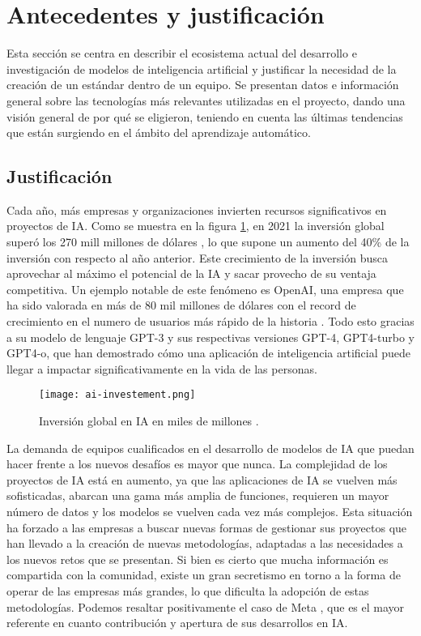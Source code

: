 \section{Antecedentes y justificación}
Esta sección se centra en describir el ecosistema actual del desarrollo e investigación 
de modelos de inteligencia artificial y justificar la necesidad de la creación de un
estándar dentro de un equipo. Se presentan datos e información general sobre las 
tecnologías más relevantes utilizadas en el proyecto, dando una visión general 
de por qué se eligieron, teniendo en cuenta las últimas tendencias que están
surgiendo en el ámbito del aprendizaje automático.

\subsection{Justificación}
Cada año, más empresas y organizaciones invierten recursos significativos en 
proyectos de IA. Como se muestra en la figura \ref{fig:ai-investement},
en 2021 la inversión global superó los 270 mill millones de dólares \cite{Letzing2024-nn},
lo que supone un aumento del 40\% de la inversión con respecto al año anterior.
Este crecimiento de la inversión busca aprovechar al máximo el potencial de la IA 
y sacar provecho de su ventaja competitiva. Un ejemplo notable de este fenómeno es OpenAI, 
una empresa que ha sido valorada en más de 80 mil millones de dólares \cite{noauthor_2024-uj} con el record de crecimiento 
en el numero de usuarios más rápido de la historia \cite{Armenta2023-xt}. Todo esto
gracias a su modelo de lenguaje GPT-3 y sus respectivas versiones GPT-4, GPT4-turbo y GPT4-o, 
que han demostrado cómo una aplicación de inteligencia artificial puede llegar a
impactar significativamente en la vida de las personas.

\begin{figure}[ht]
    \centering
    \texttt{[image: ai-investement.png]}
    \caption{Inversión global en IA en miles de millones \cite{Letzing2024-nn}.}
    \label{fig:ai-investement}
\end{figure}

La demanda de equipos cualificados en el desarrollo de modelos de IA 
que puedan hacer frente a los nuevos desafíos es mayor que nunca. La complejidad
de los proyectos de IA está en aumento, ya que las aplicaciones de IA
se vuelven más sofisticadas, abarcan una gama más amplia de funciones, requieren
un mayor número de datos y los modelos se vuelven cada vez más complejos. Esta
situación ha forzado a las empresas a buscar nuevas formas de gestionar sus proyectos
que han llevado a la creación de nuevas metodologías, adaptadas a las necesidades
a los nuevos retos que se presentan. Si bien es cierto que mucha información es
compartida con la comunidad, existe un gran secretismo en torno a la forma de operar
de las empresas más grandes, lo que dificulta la adopción de estas metodologías.
Podemos resaltar positivamente el caso de Meta \cite{metaia}, que es el mayor 
referente en cuanto contribución y apertura de sus desarrollos en IA.\medskip

